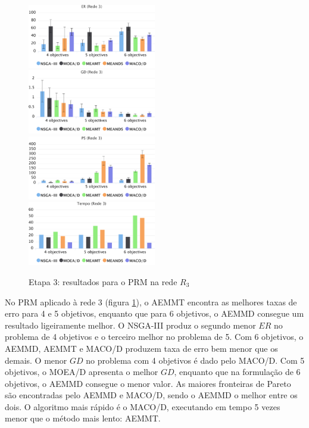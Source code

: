 \begin{figure}[!htbp]
	\caption{Etapa 3: resultados para o PRM na rede $R_3$}
	\label{fig_exp3_prm_r3}
	\includegraphics[width=0.5\textwidth]{cap_experimentos/figs/etapa3/er-mrp-r3}
	\includegraphics[width=0.5\textwidth]{cap_experimentos/figs/etapa3/gd-mrp-r3}
	\includegraphics[width=0.5\textwidth]{cap_experimentos/figs/etapa3/ps-mrp-r3}
	\includegraphics[width=0.5\textwidth]{cap_experimentos/figs/etapa3/time-mrp-r3}
\end{figure}

No PRM aplicado à rede 3 (figura \ref{fig_exp3_prm_r3}), o AEMMT encontra as melhores taxas de erro para 4 e 5 objetivos, enquanto que para 6 objetivos, o AEMMD consegue um resultado ligeiramente melhor. O NSGA-III produz o segundo menor $ER$ no problema de 4 objetivos e o terceiro melhor no problema de 5. Com 6 objetivos, o AEMMD, AEMMT e MACO/D produzem taxa de erro bem menor que os demais. O menor $GD$ no problema com 4 objetivos é dado pelo MACO/D. Com 5 objetivos, o MOEA/D apresenta o melhor $GD$, enquanto que na formulação de 6 objetivos, o AEMMD consegue o menor valor. As maiores fronteiras de Pareto são encontradas pelo AEMMD e MACO/D, sendo o AEMMD o melhor entre os dois. O algoritmo mais rápido é o MACO/D, executando em tempo 5 vezes menor que o método mais lento: AEMMT.

